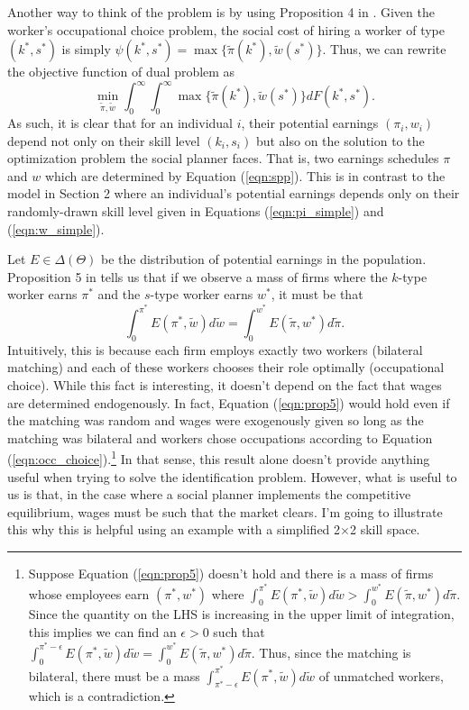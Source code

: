 \documentclass[12 pt]{article}
\begin{document}
Another way to think of the problem is by using Proposition 4 in \citet{mak2025occupational}. Given the worker's occupational choice problem, the social cost of hiring a worker of type $(k^*,s^*)$ is simply $\psi(k^*,s^*) = \max\{\tilde{\pi}(k^*),\tilde{w}(s^*)\}$. Thus, we can rewrite the objective function of dual problem as
\begin{equation}
	\min_{\tilde{\pi},\tilde{w}} \int_0^\infty \int_0^\infty \max\{\tilde{\pi}(k^*),\tilde{w}(s^*)\} dF(k^*,s^*).
	\label{eqn:spp}
\end{equation}
As such, it is clear that for an individual $i$, their potential earnings $(\pi_i,w_i)$ depend not only on their skill level $(k_i,s_i)$ but also on the solution to the optimization problem the social planner faces. That is, two earnings schedules $\pi$ and $w$ which are determined by Equation (\ref{eqn:spp}). This is in contrast to the model in Section 2 where an individual's potential earnings depends only on their randomly-drawn skill level given in Equations (\ref{eqn:pi_simple}) and (\ref{eqn:w_simple}).

Let $E \in \Delta(\Theta)$ be the distribution of potential earnings in the population. Proposition 5 in \citet{mak2025occupational} tells us that if we observe a mass of firms where the $k$-type worker earns $\pi^*$ and the $s$-type worker earns $w^*$, it must be that
\begin{equation}
	\int_0^{\pi^*} E(\pi^*,\tilde{w}) d\tilde{w} = \int_0^{w^*} E(\tilde{\pi},w^*) d \tilde{\pi}.
	\label{eqn:prop5}
\end{equation}
Intuitively, this is because each firm employs exactly two workers (bilateral matching) and each of these workers chooses their role optimally (occupational choice). While this fact is interesting, it doesn't depend on the fact that wages are determined endogenously. In fact, Equation (\ref{eqn:prop5}) would hold even if the matching was random and wages were exogenously given so long as the matching was bilateral and workers chose occupations according to Equation (\ref{eqn:occ_choice}).\footnote{Suppose Equation (\ref{eqn:prop5}) doesn't hold and there is a mass of firms whose employees earn $(\pi^*,w^*)$ where $\int_0^{\pi^*} E(\pi^*,\tilde{w}) d\tilde{w} > \int_0^{w^*} E(\tilde{\pi},w^*) d \tilde{\pi}$. Since the quantity on the LHS is increasing in the upper limit of integration, this implies we can find an $\epsilon > 0$ such that $\int_0^{\pi^*-\epsilon} E(\pi^*,\tilde{w}) d\tilde{w} = \int_0^{w^*} E(\tilde{\pi},w^*) d \tilde{\pi}$. Thus, since the matching is bilateral, there must be a mass $\int_{\pi^*-\epsilon}^{\pi^*} E(\pi^*,\tilde{w}) d\tilde{w}$ of unmatched workers, which is a contradiction. } In that sense, this result alone doesn't provide anything useful when trying to solve the identification problem. However, what is useful to us is that, in the case where a social planner implements the competitive equilibrium, wages must be such that the market clears. I'm going to illustrate this why this is helpful using an example with a simplified 2$\times$2 skill space.
\end{document}
